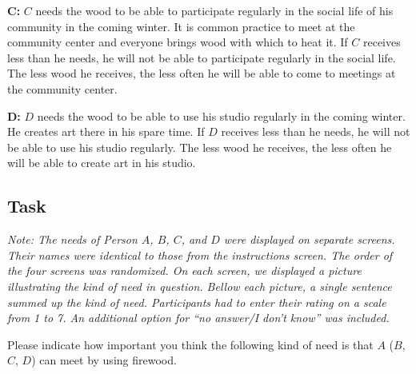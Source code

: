 \documentclass[egregdoesnotlikesansseriftitles]{scrartcl}
\begin{document}
\noindent\textbf{C:} $C$ needs the wood to be able to participate regularly in the social life of his community in the coming winter. %
It is common practice to meet at the community center and everyone brings wood with which to heat it. %
If $C$ receives less than he needs, he will not be able to participate regularly in the social life. %
The less wood he receives, the less often he will be able to come to meetings at the community center.\vspace{2ex} %

\noindent\textbf{D:} $D$ needs the wood to be able to use his studio regularly in the coming winter. %
He creates art there in his spare time. %
If $D$ receives less than he needs, he will not be able to use his studio regularly. %
The less wood he receives, the less often he will be able to create art in his studio.\vspace{2ex} %


\subsection*{Task}
\noindent\textit{Note: The needs of Person $A$, $B$, $C$, and $D$ were displayed on separate screens.
Their names were identical to those from the instructions screen.
The order of the four screens was randomized.
On each screen, we displayed a picture illustrating the kind of need in question.
Bellow each picture, a single sentence summed up the kind of need.
Participants had to enter their rating on a scale from 1 to 7.
An additional option for ``no answer/I don't know'' was included.}\vspace{2ex}

\noindent Please indicate how important you think the following kind of need is that $A$ ($B$, $C$, $D$) can meet by using firewood.\vspace{2ex} %
\end{document}

